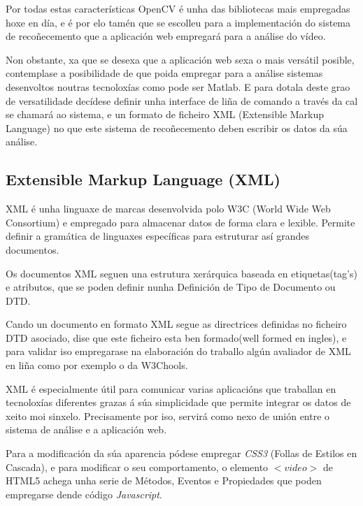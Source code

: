    Por todas estas características OpenCV é unha das bibliotecas mais empregadas hoxe en día, e é
    por elo tamén que se escolleu para a implementación do sistema de recoñecemento que a aplicación
    web empregará para a análise do vídeo.
    
    Non obstante, xa que se desexa que a aplicación web sexa o mais versátil posible, contemplase a
    posibilidade de que poida empregar para a análise sistemas desenvoltos noutras tecnoloxías como
    pode ser Matlab. E para dotala deste grao de versatilidade decídese definir unha interface de
    liña de comando a través da cal se chamará ao sistema, e un formato de ficheiro XML (Extensible 
    Markup Language) no que este sistema de recoñecemento deben escribir os datos da súa análise.
        
\subsection{Extensible Markup Language (XML)}
    XML é unha linguaxe de marcas desenvolvida polo W3C (World Wide Web Consortium) e empregado
    para almacenar datos de forma clara e lexible. Permite definir a gramática de linguaxes 
    específicas para estruturar así grandes documentos.
    
    Os documentos XML seguen una estrutura xerárquica baseada en etiquetas(tag's) e atributos,
    que se poden definir nunha Definición de Tipo de Documento ou DTD. \cite{dtd-web-page}
    
    Cando un documento en formato XML segue as directrices definidas no ficheiro DTD asociado,
    dise que este ficheiro esta ben formado(well formed en ingles), e para validar iso empregarase
    na elaboración do traballo algún avaliador de XML en liña como por exemplo o da W3Chools.\cite{xml-validator}
    
    XML é especialmente útil para comunicar varias aplicacións que traballan en tecnoloxías 
    diferentes grazas á súa simplicidade que permite integrar os datos de xeito moi sinxelo. Precisamente
    por iso, servirá como nexo de unión entre o sistema de análise e a aplicación web. 
    
    Para a modificación da súa aparencia pódese empregar \emph{CSS3} (Follas de Estilos en 
    Cascada), e para modificar o seu comportamento, o elemento $<video>$ de HTML5 achega
    unha serie de Métodos, Eventos e Propiedades\cite{w3school-video-events} que poden
    empregarse dende código \emph{Javascript}.
    
